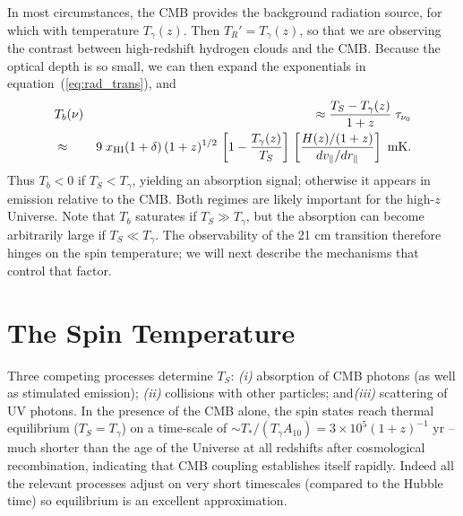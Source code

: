 \documentclass[a4paper,openany, 12pt]{book}
\begin{document}
In most circumstances, the CMB provides the background radiation source, for which with temperature $T_\gamma(z)$. Then $T_R' = T_{\gamma}(z)$, so that  we are observing the contrast between high-redshift hydrogen clouds and the CMB.   Because the optical depth is so small, we can then expand the exponentials in equation~(\ref{eq:rad_trans}), and
\begin{eqnarray}
& T_b(\nu) & \approx \frac{T_S-T_{\gamma}(z)}{1+z}\;\tau_{\nu_0} 
\label{eq:dtbone} \\
& \approx & 9\;x_{\rm HI}(1+\delta) \, (1+z)^{1/2}\, \left[1-\frac{T_{\gamma}(z)}{T_S}\right] \, \left[ \frac{H(z)/(1+z)}{d v_\parallel/d r_\parallel} \right] \ \mbox{mK}.
\label{eq:dtb}
\end{eqnarray}
Thus $T_b < 0$ if $T_S < T_{\gamma}$, yielding an absorption signal; otherwise it appears in emission relative to the CMB. Both regimes are likely important for the high-$z$ Universe. Note that $T_b$ saturates if $T_S \gg T_{\gamma}$, but the absorption can become arbitrarily large if $T_S \ll T_{\gamma}$.  The observability of the 21 cm transition therefore hinges on the spin temperature; we will next describe the mechanisms that control that factor.

\section{The Spin Temperature} \label{spin-temp}

Three competing processes determine $T_S$: {\it (i)} absorption of CMB photons (as well as stimulated emission); {\it (ii)} collisions with other particles; and{\it (iii)} scattering of UV photons.  In the presence of the CMB
alone, the spin states reach thermal equilibrium ($T_S=T_{\gamma}$) on a time-scale of $\sim T_*/(T_\gamma A_{10}) = 3 \times 10^5 (1+z)^{-1}$ yr -- much shorter than the age of the Universe at all redshifts after cosmological recombination, indicating that CMB coupling establishes itself rapidly. Indeed all the relevant processes adjust on very short timescales (compared to the Hubble time) so equilibrium is an excellent approximation.
\end{document}
